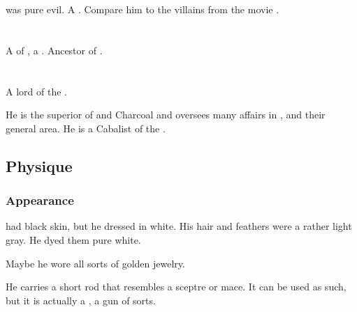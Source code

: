 \Morcariel was pure evil. 
A . 
Compare him to the villains from the movie \cite{Movie:Avatar}. 















\section{\Shehizol}
\index{\Shehizol}
A \resvil{} of \CiriathSepher, a \sathariah. 
Ancestor of . 















\section{\Teshrial}
\index{\Teshrial}
A \resphan{} lord of the \CiriathSepher. 

He is the superior of \Achsah{} and Charcoal and oversees many affairs in \Malcur, \Scyrum{} and their general area. He is a Cabalist of the . 








\subsection{Physique}





\subsubsection{Appearance}
\Teshrial{} had black skin, but he dressed in white.
His hair and feathers were a rather light gray.
He dyed them pure white. 

Maybe he wore all sorts of golden jewelry. 

He carries a short rod that resembles a sceptre or mace. It can be used as such, but it is actually a , a gun of sorts. 


